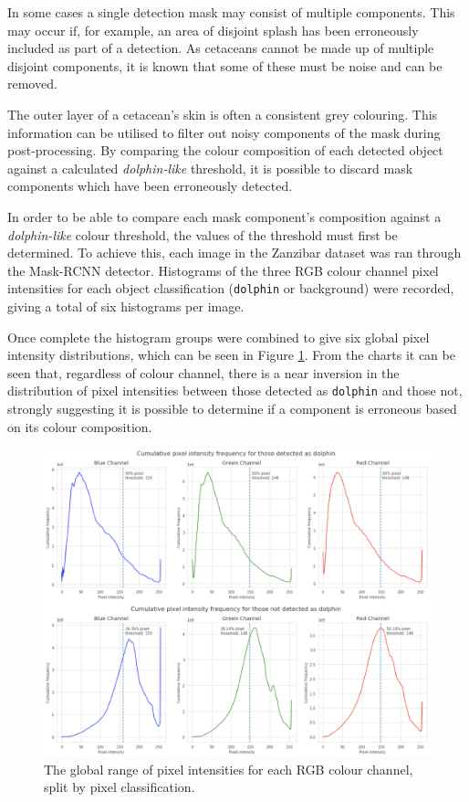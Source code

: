 In some cases a single detection mask may consist of multiple components. This may occur if, for example, an area of disjoint splash has been erroneously included as part of a detection. As cetaceans cannot be made up of multiple disjoint components, it is known that some of these must be noise and can be removed. 

The outer layer of a cetacean's skin is often a consistent grey colouring. This information can be utilised to filter out noisy components of the mask during post-processing. By comparing the colour composition of each detected object against a calculated \textit{dolphin-like} threshold, it is possible to discard mask components which have been erroneously detected.

In order to be able to compare each mask component's composition against a \textit{dolphin-like} colour threshold, the values of the threshold must first be determined. To achieve this, each image in the Zanzibar dataset was ran through the Mask-RCNN detector. Histograms of the three RGB colour channel pixel intensities for each object classification (\texttt{dolphin} or background) were recorded, giving a total of six histograms per image. 

Once complete the histogram groups were combined to give six global pixel intensity distributions, which can be seen in Figure \ref{fig:global-histogram}. From the charts it can be seen that, regardless of colour channel, there is a near inversion in the distribution of pixel intensities between those detected as \texttt{dolphin} and those not, strongly suggesting it is possible to determine if a component is erroneous based on its colour composition.

\begin{figure}
	\begin{center}
		\includegraphics[scale=0.7]{Chapter4/figs/histogram.png}
	\end{center}
	\caption{The global range of pixel intensities for each RGB colour channel, split by pixel classification.}\label{fig:global-histogram}
\end{figure}

